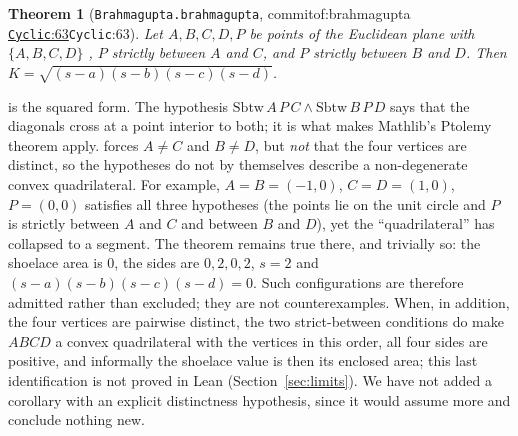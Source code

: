 \documentclass[11pt]{article}
\newtheorem{theorem}{Theorem}
\theoremstyle{definition}
\theoremstyle{remark}
\newcommand{\commitof}[1]{\csname commitof:#1\endcsname}
\newcommand{\repo}[1]{https://github.com/jpbald93/#1}
\newcommand{\src}[4]{\ifcsname commitof:#1\endcsname
  \href{\repo{#1}/blob/\commitof{#1}/#2/#3.lean\#L#4}{\texttt{#3}:#4}\else\texttt{#3}:#4\fi}
\begin{document}
\begin{theorem}[\texttt{Brahmagupta.brahmagupta}, \src{brahmagupta}{Brahmagupta}{Cyclic}{63}]\label{thm:brahmagupta}
Let $A,B,C,D,P$ be points of the Euclidean plane with $\{A,B,C,D\}$ , $P$
strictly between $A$ and $C$, and $P$ strictly between $B$ and $D$. Then
$K=\sqrt{(s-a)(s-b)(s-c)(s-d)}$.
\end{theorem}

 is the squared form. The hypothesis
$\mathrm{Sbtw}\,A\,P\,C\wedge\mathrm{Sbtw}\,B\,P\,D$ says that the diagonals cross at a point
interior to both; it is what makes Mathlib's Ptolemy theorem apply.  forces $A\ne C$
and $B\ne D$, but \emph{not} that the four vertices are distinct, so the hypotheses do not by
themselves describe a non-degenerate convex quadrilateral. For example, $A=B=(-1,0)$,
$C=D=(1,0)$, $P=(0,0)$ satisfies all three hypotheses (the points lie on the unit circle and $P$ is
strictly between $A$ and $C$ and between $B$ and $D$), yet the ``quadrilateral'' has collapsed to
a segment. The theorem remains true there, and trivially so: the shoelace area is $0$, the sides
are $0,2,0,2$, $s=2$ and $(s-a)(s-b)(s-c)(s-d)=0$. Such configurations are therefore admitted
rather than excluded; they are not counterexamples. When, in addition, the four vertices are
pairwise distinct, the two strict-between conditions do make $ABCD$ a convex quadrilateral with
the vertices in this order, all four sides are positive, and informally the shoelace value is
then its enclosed area; this last identification is not proved in Lean (Section~\ref{sec:limits}).
We have not added a corollary with an explicit distinctness hypothesis, since it would assume
more and conclude nothing new.
\end{document}
